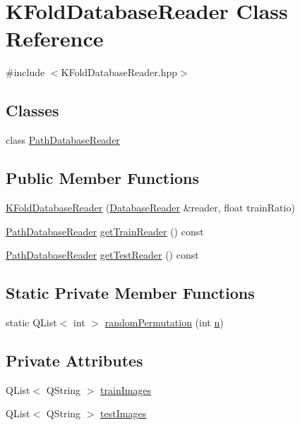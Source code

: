 \hypertarget{class_k_fold_database_reader}{\section{K\+Fold\+Database\+Reader Class Reference}
\label{class_k_fold_database_reader}
}


{\ttfamily \#include $<$K\+Fold\+Database\+Reader.\+hpp$>$}

\subsection*{Classes}
\begin{DoxyCompactItemize}
\item 
class \hyperlink{class_k_fold_database_reader_1_1_path_database_reader}{Path\+Database\+Reader}
\end{DoxyCompactItemize}
\subsection*{Public Member Functions}
\begin{DoxyCompactItemize}
\item 
\hyperlink{class_k_fold_database_reader_a50c775127f0a9decc8d7f275005cd437}{K\+Fold\+Database\+Reader} (\hyperlink{class_database_reader}{Database\+Reader} \&reader, float train\+Ratio)
\item 
\hyperlink{class_k_fold_database_reader_1_1_path_database_reader}{Path\+Database\+Reader} \hyperlink{class_k_fold_database_reader_a2a94b70899a67487649330c72a545e5a}{get\+Train\+Reader} () const 
\item 
\hyperlink{class_k_fold_database_reader_1_1_path_database_reader}{Path\+Database\+Reader} \hyperlink{class_k_fold_database_reader_a5a39e6986d09d77427d98c2ba7a25131}{get\+Test\+Reader} () const 
\end{DoxyCompactItemize}
\subsection*{Static Private Member Functions}
\begin{DoxyCompactItemize}
\item 
static Q\+List$<$ int $>$ \hyperlink{class_k_fold_database_reader_a2f8223aae421c533d260b5d6e65c09e8}{random\+Permutation} (int \hyperlink{print_report_8m_aeab71244afb687f16d8c4f5ee9d6ef0e}{n})
\end{DoxyCompactItemize}
\subsection*{Private Attributes}
\begin{DoxyCompactItemize}
\item 
Q\+List$<$ Q\+String $>$ \hyperlink{class_k_fold_database_reader_a93461f0d927f76d6dad7af885e16b172}{train\+Images}
\item 
Q\+List$<$ Q\+String $>$ \hyperlink{class_k_fold_database_reader_a224507fbe965e1fb12089fb572d72681}{test\+Images}
\end{DoxyCompactItemize}


